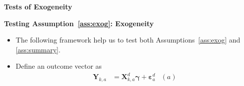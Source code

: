 \documentclass[static]{JJH-Beamer}
\begin{document}
{}
\begin{frame}

\hypertarget{tarttarttart}{}
\begin{center}
\textbf{Tests of Exogeneity}
\end{center}

\end{frame}

\begin{frame}

\begin{block}{}
\begin{center}
\textbf{Testing Assumption~\ref{ass:exog}: Exogeneity}
\end{center}
\end{block}

\end{frame}

\begin{frame}

\begin{itemize}
\item The following framework help us to test both Assumptions~\ref{ass:exog} and \ref{ass:summary}.
\item Define an outcome vector as
    \begin{align}
    \bm{Y}_{k,a} &= \bm{X}^d_{k,a} \bm{\gamma} + \bm{\varepsilon}^d_a  &(a) \nonumber
    \end{align}
\end{itemize}

\end{frame}
\end{document}
